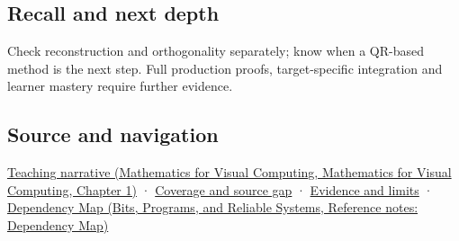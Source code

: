 \subsection{Recall and next depth}\label{appendix-c39f1ed34271-recall-and-next-depth}

Check reconstruction and orthogonality separately; know when a QR-based method is the next step. Full production proofs, target-specific integration and learner mastery require further evidence.

\subsection{Source and navigation}\label{appendix-c39f1ed34271-source-and-navigation}

\href{../02-Mathematics-for-Visual-Computing/main.pdf\#nameddest=01-foundations-i-ch017-orthonormal-frames-make-reconstruction-simple}{Teaching narrative (Mathematics for Visual Computing, Mathematics for Visual Computing, Chapter 1)} · \hyperref[appendix-fd090d982a15-phase-6---parts-501-600]{Coverage and source gap} · \hyperref[appendix-a103e7846d21-phase-6---source-analysis-and-verification]{Evidence and limits} · \href{../01-Bits-Programs-and-Reliable-Systems/main.pdf\#nameddest=appendix-4ad47bdd269a}{Dependency Map (Bits, Programs, and Reliable Systems, Reference notes: Dependency Map)}
